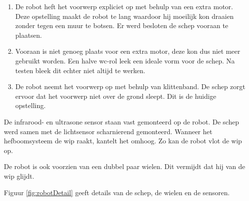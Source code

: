 \documentclass[tt2]{penoverslag}
\begin{document}
\begin{enumerate}
\item De robot heft het voorwerp expliciet op met behulp van een extra motor. Deze opstelling maakt de robot te lang waardoor hij moeilijk kon draaien zonder tegen een muur te botsen. Er werd besloten de schep vooraan te plaatsen.
\item Vooraan is niet genoeg plaats voor een extra motor, deze kon dus niet meer gebruikt worden. Een halve wc-rol leek een ideale vorm voor de schep. Na testen bleek dit echter niet altijd te werken.
\item De robot neemt het voorwerp op met behulp van klittenband. De schep zorgt ervoor dat het voorwerp niet over de grond sleept. Dit is de huidige opstelling.
\end{enumerate}

De infrarood- en ultrasone sensor staan vast gemonteerd op de robot. De schep werd samen met de lichtsensor scharnierend gemonteerd. Wanneer het hefboomsysteem de wip raakt, kantelt het omhoog. Zo kan de robot vlot de wip op.

De robot is ook voorzien van een dubbel paar wielen. Dit vermijdt dat hij van de wip glijdt.

Figuur \ref{fig:robotDetail} geeft details van de schep, de wielen en de sensoren.
\end{document}
